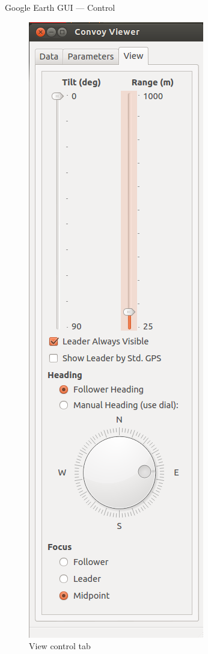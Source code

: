 \documentclass{beamer}
\begin{document}
\begin{frame}{Google Earth GUI --- Control}
\begin{figure}[!htb]
          \includegraphics[height=0.85\textheight]{../graphics/earth_view.png}
          \caption{\tiny View control tab}
        \endminipage
      \end{figure}
    \end{frame}
\end{document}
